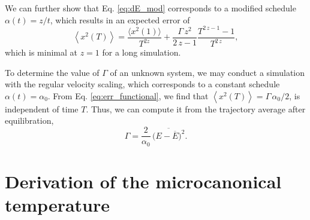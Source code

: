 \documentclass[reprint]{revtex4-1}
\begin{document}
We can further show that Eq. \eqref{eq:dE_mod}
corresponds to a modified schedule
$\alpha(t) = z/t$,
which results in an expected error of
\begin{equation}
  \left\langle
  x^2(T)
  \right\rangle
  =
  \frac{ \langle x^2(1) \rangle } { T^{2z} }
  +
  \frac{ \Gamma \, z^2 } { 2 \, z - 1 }
  \frac{
    T^{2 \, z - 1} - 1
  }
  {
    T^{2 \, z}
  }
  ,
  \label{eq:err_zovert}
\end{equation}
which is minimal at $z = 1$ for a long simulation.

To determine the value of $\Gamma$ of an unknown system,
we may conduct a simulation with the regular velocity scaling,
which corresponds to a constant schedule $\alpha(t) = \alpha_0$.
%
From Eq. \eqref{eq:err_functional}, we find that
$\left\langle
  x^2(T)
\right\rangle
=
\Gamma \, \alpha_0 / 2$,
is independent of time $T$.
Thus, we can compute it from the trajectory average
after equilibration,
\begin{equation}
\Gamma
=
\frac{ 2 } { \alpha_0 } \,
\overline{
  \bigl(
    E - \overline E
  \bigr)^2
}
.
\label{eq:Gamma_alpha0}
\end{equation}


\section{Derivation of the microcanonical temperature}
\end{document}
